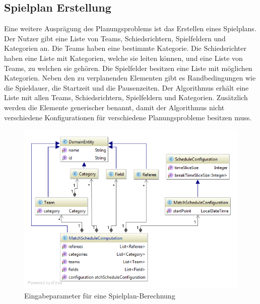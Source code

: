 %
%
%
%

\subsection{Spielplan Erstellung}
Eine weitere Ausprägung des Planungsproblems ist das Erstellen eines Spielplans. Der Nutzer gibt eine Liste von Teams, Schiedsrichtern, Spielfeldern und Kategorien an. Die Teams haben eine 
bestimmte Kategorie. Die Schiedsrichter haben eine Liste mit Kategorien, welche sie leiten können, und eine Liste von Teams, zu welchen sie gehören. Die Spielfelder besitzen eine Liste mit 
möglichen Kategorien. Neben den zu verplanenden Elementen gibt es Randbedingungen wie die Spieldauer, die Startzeit und die Pausenzeiten. Der Algorithmus erhält eine 
Liste mit allen Teams, Schiedsrichtern, Spielfeldern und Kategorien. Zusätzlich werden die Elemente generischer benannt, damit der Algorithmus nicht verschiedene Konfigurationen für 
verschiedene Planungsprobleme besitzen muss.

\begin{figure}[h]
\centering
\includegraphics[scale=0.5]{images/probleme/matchSchedule.png}
\caption[Eingabeparameter für eine Spielplan-Berechnung]{Eingabeparameter für eine Spielplan-Berechnung \selfmade{}}
\label{fig:matchschedule_input}
\end{figure}

